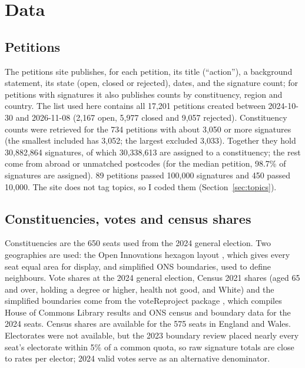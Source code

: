 \documentclass[11pt,a4paper]{article}
\begin{document}
\section{Data}\label{sec:data}
\subsection{Petitions}
The petitions site \citep{petitions2026} publishes, for each petition, its title (``action''), a background statement, its state (open, closed or rejected), dates, and the signature count; for petitions with signatures it also publishes counts by constituency, region and country. The list used here contains all 17,201 petitions created between 2024-10-30 and 2026-11-08 (2,167 open, 5,977 closed and 9,057 rejected). Constituency counts were retrieved for the 734 petitions with about 3,050 or more signatures (the smallest included has 3,052; the largest excluded 3,033). Together they hold 30,882,864 signatures, of which 30,338,613 are assigned to a constituency; the rest come from abroad or unmatched postcodes (for the median petition, 98.7\% of signatures are assigned). 89 petitions passed 100,000 signatures and 450 passed 10,000. The site does not tag topics, so I coded them (Section~\ref{sec:topics}).

\subsection{Constituencies, votes and census shares}
Constituencies are the 650 seats used from the 2024 general election. Two geographies are used: the Open Innovations hexagon layout \citep{openinnovations2023}, which gives every seat equal area for display, and simplified ONS boundaries, used to define neighbours. Vote shares at the 2024 general election, Census 2021 shares (aged 65 and over, holding a degree or higher, health not good, and White) and the simplified boundaries come from the voteReproject package \citep{horan2025}, which compiles House of Commons Library results and ONS census and boundary data for the 2024 seats. Census shares are available for the 575 seats in England and Wales. Electorates were not available, but the 2023 boundary review placed nearly every seat's electorate within 5\% of a common quota, so raw signature totals are close to rates per elector; 2024 valid votes serve as an alternative denominator.
\end{document}

